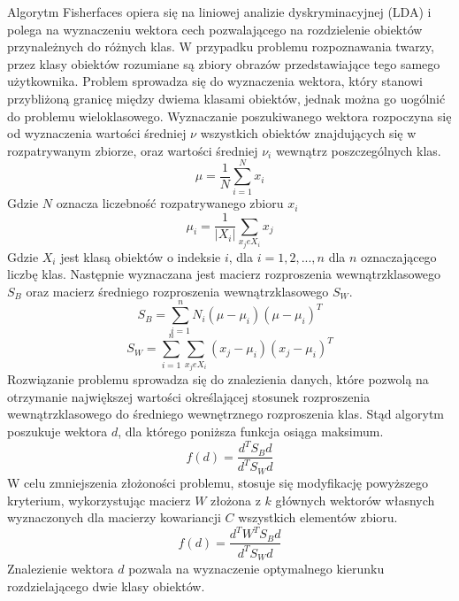 Algorytm Fisherfaces opiera się na liniowej analizie dyskryminacyjnej (LDA) i polega na wyznaczeniu wektora cech pozwalającego na rozdzielenie obiektów przynależnych do różnych klas. W przypadku problemu rozpoznawania twarzy, przez klasy obiektów rozumiane są zbiory obrazów przedstawiające tego samego użytkownika. Problem sprowadza się do wyznaczenia wektora, który stanowi przybliżoną granicę między dwiema klasami obiektów, jednak można go uogólnić do problemu wieloklasowego.
Wyznaczanie poszukiwanego wektora rozpoczyna się od wyznaczenia wartości średniej $\nu$ wszystkich obiektów znajdujących się w rozpatrywanym zbiorze, oraz wartości średniej $\nu_{i}$ wewnątrz poszczególnych klas. 
$$
\mu=\frac{1}{N}\sum_{i=1}^{N}x_{i}
$$
Gdzie $N$ oznacza liczebność rozpatrywanego zbioru $x_{i}$
$$
\mu_{i}=\frac{1}{|X_{i}|}\sum_{x_{j}eX_{i}}x_{j}
$$
Gdzie $X_{i}$ jest klasą obiektów o indeksie $i$, dla $i=1,2,...,n$ dla $n$ oznaczającego liczbę klas. Następnie wyznaczana jest macierz rozproszenia wewnątrzklasowego $S_{B}$ oraz macierz średniego rozproszenia wewnątrzklasowego $S_{W}$.
$$
S_{B}=\sum_{i=1}^{n}N_{i}(\mu-\mu_{i})(\mu-\mu_{i})^{T}
$$
$$
S_{W}=\sum_{i=1}^{n}\sum_{x_{j}eX_{i}}(x_{j}-\mu_{i})(x_{j}-\mu_{i})^{T}
$$
Rozwiązanie problemu sprowadza się do znalezienia danych, które pozwolą na otrzymanie największej wartości określającej stosunek rozproszenia wewnątrzklasowego do średniego wewnętrznego rozproszenia klas. Stąd algorytm poszukuje wektora $d$, dla którego poniższa funkcja osiąga maksimum.
$$
f(d)=\frac{d^{T}S_{B}d}{d^{T}S_{W}d}
$$
W celu zmniejszenia złożoności problemu, stosuje się modyfikację powyższego kryterium, wykorzystując macierz $W$ złożona z $k$ głównych wektorów własnych wyznaczonych dla macierzy kowariancji $C$ wszystkich elementów zbioru.
$$
f(d)=\frac{d^{T}W^{T}S_{B}d}{d^{T}S_{W}d}
$$
Znalezienie wektora $d$ pozwala na wyznaczenie optymalnego kierunku rozdzielającego dwie klasy obiektów.

